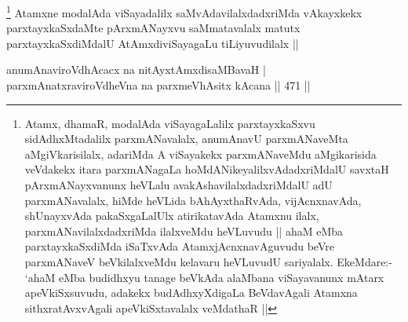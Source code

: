 \begin{artha}
\footnote{Atamx, dhamaR, modalAda viSayagaLalilx parxtayxkaSxvu sidAdhxMtadalilx parxmANavalalx, anumAnavU parxmANaveMta aMgiVkarisilalx, adariMda A viSayakekx parxmANaveMdu aMgikarisida veVdakekx itara parxmANagaLa hoMdANikeyalilxvAdadxriMdalU savxtaH pArxmANayxvanunx heVLalu avakAshavilalxdadxriMdalU adU parxmANavalalx, hiMde heVLida bAhAyxthaRvAda, vijAcnxnavAda, shUnayxvAda pakaSxgaLalUlx atirikatavAda Atamxnu ilalx, parxmANavilalxdadxriMda ilalxveMdu heVLuvudu || ahaM eMba parxtayxkaSxdiMda iSaTxvAda AtamxjAcnxnavAguvudu beVre parxmANaveV beVkilalxveMdu kelavaru heVLuvudU sariyalalx. EkeMdare:- `ahaM eMba budidhxyu tanage beVkAda alaMbana viSayavanunx mAtarx apeVkiSxsuvudu, adakekx budAdhxyXdigaLa BeVdavAgali Atamxna sithxratAvxvAgali apeVkiSxtavalalx veMdathaR ||} Atamxne modalAda viSayadalilx saMvAdavilalxdadxriMda vAkayxkekx parxtayxkaSxdaMte pArxmANayxvu saMmatavalalx matutx parxtayxkaSxdiMdalU AtAmxdiviSayagaLu tiLiyuvudilalx ||
\end{artha}

\begin{shl}
anumAnaviroVdhAcacx na nitAyxtAmxdisaMBavaH | \\
parxmAnatxraviroVdheVna na parxmeVhAsitx kAcana \hfill||  471 ||  
\end{shl}

